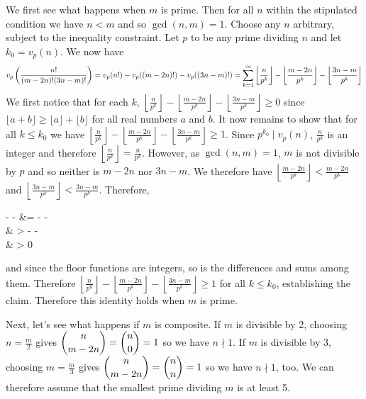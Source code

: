 \documentclass[11pt,a4paper]{article}
\begin{document}
\begin{enumerate}
	We first see what happens when $m$ is prime. Then for all $n$ within the stipulated condition we have $n<m$ and so $\gcd(n, m)=1$. Choose any $n$ arbitrary, subject to the inequality constraint. 
	Let $p$ to be any prime dividing $n$ and let $k_0=v_p(n)$. We now have 
	\[v_p\left(\frac{n!}{(m-2n)!(3n-m)!}\right)
	= v_p(n!) - v_p((m-2n)!) - v_p((3n-m)!)
	= \displaystyle\sum_{k=1}^{\infty}\left\lfloor \frac{n}{p^k}\right\rfloor - \left\lfloor \frac{m-2n}{p^k}\right\rfloor - \left\lfloor \frac{3n-m}{p^k}\right\rfloor
	\]
	We first notice that for each $k$, $\left\lfloor \frac{n}{p^k}\right\rfloor - \left\lfloor \frac{m-2n}{p^k}\right\rfloor - \left\lfloor \frac{3n-m}{p^k}\right\rfloor\ge 0$ since $\lfloor a+b\rfloor \ge \lfloor a\rfloor + \lfloor b\rfloor$ for all real numbers $a$ and $b$. 
	It now remains to show that for all $k\le k_0$ we have $\left\lfloor \frac{n}{p^k}\right\rfloor - \left\lfloor \frac{m-2n}{p^k}\right\rfloor - \left\lfloor \frac{3n-m}{p^k}\right\rfloor \ge 1$. 
	Since $p^{k_0}\mid v_p(n)$, $\frac{n}{p^k}$ is an integer and therefore $\left\lfloor \frac{n}{p^k}\right\rfloor  = \frac{n}{p^k}$. 
	However, as $\gcd(n, m)=1$, $m$ is not divisible by $p$ and so neither is $m-2n$ nor $3n-m$. 
	We therefore have $\left\lfloor \frac{m-2n}{p^k}\right\rfloor < \frac{m-2n}{p^k}$ and 
	$\left\lfloor \frac{3n-m}{p^k}\right\rfloor < \frac{3n-m}{p^k}$. Therefore, 
	\begin{flalign*}
	\left\lfloor {}\right\rfloor - \left\lfloor {}\right\rfloor - \left\lfloor {}\right\rfloor
	&=  - \left\lfloor {}\right\rfloor - \left\lfloor {}\right\rfloor
	\\& >  -  -  
	\\& > 0
	\end{flalign*}
	and since the floor functions are integers, so is the differences and sums among them. Therefore $\left\lfloor \frac{n}{p^k}\right\rfloor - \left\lfloor \frac{m-2n}{p^k}\right\rfloor - \left\lfloor \frac{3n-m}{p^k}\right\rfloor\ge 1$ for all $k\le k_0$, establishing the claim. 
	Therefore this identity holds when $m$ is prime. 
	
	Next, let's see what happens if $m$ is composite. If $m$ is divisible by 2, choosing $n=\frac{m}{2}$ gives $\dbinom{n}{m-2n}=\dbinom{n}{0}=1$ so we have $n\nmid 1$. If $m$ is divisible by 3, choosing $m=\frac{m}{3}$ gives $\dbinom{n}{m-2n}=\dbinom{n}{n}=1$ so we have $n\nmid 1$, too. We can therefore assume that the smallest prime dividing $m$ is at least 5. 
	

\end{enumerate}
\end{document}
